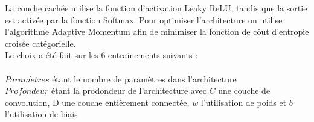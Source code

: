 \begin{multicols}{2}
La couche cachée utilise la fonction d’activation Leaky ReLU, 
tandis que la sortie est activée par la fonction Softmax. Pour optimiser l'architecture
on utilise l'algorithme Adaptive Momentum afin de minimiser la fonction de côut 
d'entropie croisée catégorielle. \\

Le choix a été fait sur les 6 entrainements suivants : \\

 \\

{\scriptsize
$Param\grave{e}tres$ étant le nombre de paramètres dans l'architecture\\

$Profondeur$ étant la prodondeur de l'architecture avec $C$ une couche de convolution, D une couche entièrement connectée, $w$ l'utilisation de poids et $b$ l'utilisation de biais \\

}
\end{multicols}
